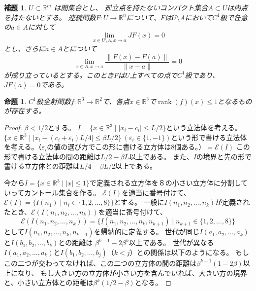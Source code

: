 \documentclass[leqno]{jsarticle}
\newtheorem{prop}[thm]{命題}
\newtheorem{lem}[thm]{補題}
\newcommand{\rr}{\mathbb{R}}
\newcommand{\ep}{\varepsilon}
\DeclareMathOperator{\rank}{rank}
\begin{document}
\begin{lem}
$U\subset \rr^m$ は開集合とし、
孤立点を持たないコンパクト集合$A\subset U$は内点を持たないとする。
連続関数$F:U\to \rr^n$について、$F$は$U\setminus A$において$C^1$級で任意の$a\in A$に対して
\[
\lim_{x\in U\setminus A, x\to a}JF(x)=0
\]
とし、さらに$a\in A$とについて
\[
\lim_{x\in A, x\to a}\frac{\|F(x)-F(a)\|}{\|x-a\|}=0
\]
が成り立っているとする。このとき$F$は$U$上すべての点で$C^1$級であり、$JF(a)=0$である。
\end{lem}
\begin{prop}
$C^1$級全射関数$f:\rr^3\to \rr^2$で、各点$x\in \rr^3$で$\rank(f)(x)\le 1$となるものが存在する。
\end{prop}
\begin{proof}
$\beta<1/2$とする。
$I=\{x\in \rr^3\mid |x_i-c_i|\le L/2\}$という立法体を考える。
$\{x\in \rr^3\mid |x_i-(c_i+\ep_i)L/4|\le \beta L/2\}\ (\ep_i\in \{1,-1\})$という形で書ける立法体を考える。（$\ep_i$の値の選び方でこの形に書ける立方体は8個ある。）$=\mathcal{E}(I)$
この形で書ける立法体の間の距離は$L/2-\beta L$以上である。
また、$I$の境界と先の形で書ける立方体との距離は$L/4-\beta L/2$以上である。

今から$I=\{x\in \rr^3\mid |x|\le 1\}$で定義される立方体を８の小さい立方体に分割していってカントール集合を作る。
$\mathcal{E}(I)$を適当に番号付けて、 $\mathcal{E}(I)=\{I(n_1)\mid n_i\in \{1,2,\dots, 8\}\}$とする。
一般に$I(n_1, n_2, \dots, n_k)$が定義されたとき、$\mathcal{E}(I(n_1, n_2, \dots, n_k))$を適当に番号付けて、
\[
\mathcal{E}(I(n_1, n_2, \dots, n_k))=\{I(n_1, n_2, \dots, n_k, n_{k+1})\mid n_{k+1}\in \{1,2,\dots, 8\}\}
\]
として$I(n_1, n_2, \dots, n_k, n_{k+1})$を帰納的に定義する。
世代が同じ$I(a_1, a_2, \dots, a_k)$と$I(b_1, b_2, \dots, b_k)$との距離は
$\beta^{k-1}-2\beta^k$以上である。
世代が異なる$I(a_1, a_2, \dots, a_k)$と$I(b_1, b_2, \dots, b_j)$（$k<j$）との関係は以下のようになる。
もしこの二つが交わってなければ、この二つの立方体の間の距離は$\beta^{k-1}(1-2\beta)$以上になり、
もし大きい方の立方体が小さい方を含んでいれば、大きい方の境界と、小さい立方体との距離は$\beta^k(1/2-\beta)$となる。


\end{proof}
\end{document}
